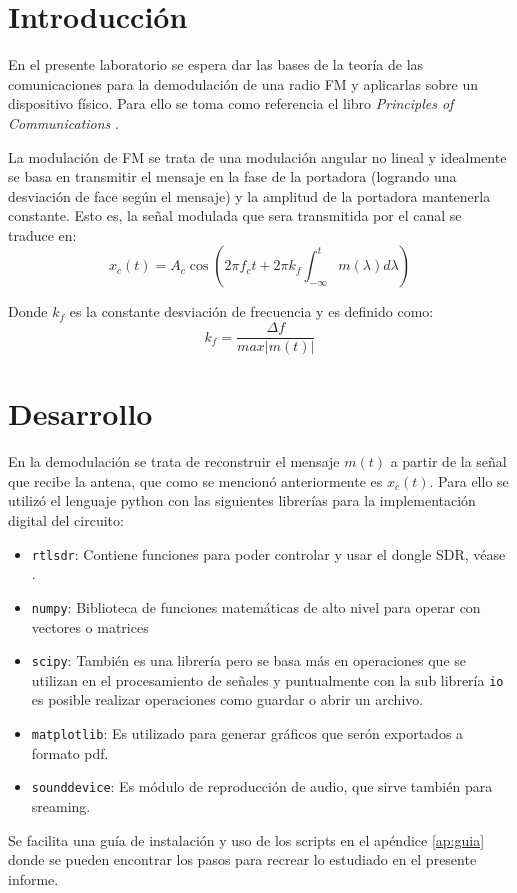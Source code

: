 \section{Introducción}
	En el presente laboratorio se espera dar las bases de la teoría de las comunicaciones para la demodulación de una radio FM y aplicarlas sobre un dispositivo físico.
Para ello se toma como referencia el libro \emph{Principles of Communications} \cite{PrinciplesofCommunications}.

La modulación de FM se trata de una modulación angular no lineal y idealmente se basa en transmitir el mensaje en la fase de la portadora (logrando una desviación de face según el mensaje) y la amplitud de la portadora mantenerla constante.
Esto es, la señal modulada que sera transmitida por el canal se traduce en:
$$
	x_c (t) = A_c \cos \left( 2 \pi f_c t + 2 \pi k_f \int_{-\infty}^{t} m(\lambda) d\lambda \right)
$$

Donde $k_f$ es la constante desviación de frecuencia y es definido como:
$$
	k_f = \frac{\Delta f}{max|m(t)|}
$$


\section{Desarrollo}
En la demodulación se trata de reconstruir el mensaje $m(t)$ a partir de la señal que recibe la antena, que como se mencionó anteriormente es $x_c(t)$.
Para ello se utilizó el lenguaje python con las siguientes librerías para la implementación digital del circuito:
\begin{itemize}
	\item \texttt{rtlsdr}: Contiene funciones para poder controlar y usar el dongle SDR, véase \cite{pyrtlsdr}.
	\item \texttt{numpy}: Biblioteca de funciones matemáticas de alto nivel para operar con vectores o matrices
	\item \texttt{scipy}: También es una librería pero se basa más en operaciones que se utilizan en el procesamiento de señales y puntualmente con la sub librería \texttt{io} es posible realizar operaciones como guardar o abrir un archivo. 
	\item \texttt{matplotlib}: Es utilizado para generar gráficos que serón exportados a formato pdf.
	\item \texttt{sounddevice}: Es módulo de reproducción de audio, que sirve también para sreaming.
\end{itemize}

Se facilita una guía de instalación y uso de los scripts en el apéndice \ref{ap:guia} donde se pueden encontrar los pasos para recrear lo estudiado en el presente informe.

